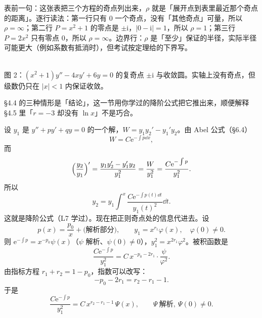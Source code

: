 \documentclass[11pt]{ctexart}
\let\origsubhdr\subhdr
\renewcommand{\subhdr}[1]{\needspace{3\baselineskip}\origsubhdr{#1}}
\newcommand{\ii}{\mathrm{i}}
\newcommand{\ee}{\mathrm{e}}
\begin{document}
表前一句：这张表把三个方程的奇点列出来，$\rho$ 就是「展开点到表里最近那个奇点的距离」。逐行读法：第一行只有 $0$ 一个奇点，没有「其他奇点」可量，所以 $\rho=\infty$；第二行 $P=x^2+1$ 的零点是 $\pm\ii$，$|0-\ii|=1$，所以 $\rho=1$；第三行 $P=2x^2$ 只有零点 $0$，所以 $\rho=\infty$。边界行：$\rho$ 是「至少」保证的半径，实际半径可能更大（例如系数有抵消时），但考试按定理给的下界写。

\begin{center}
\\[2pt]
{\small\color{inkgray}图 2：$(x^2+1)y''-4xy'+6y=0$ 的复奇点 $\pm\ii$ 与收敛圆。实轴上没有奇点，但级数仍只在 $|x|<1$ 内保证收敛。}
\end{center}



§4.4 的三种情形是「结论」，这一节用你学过的降阶公式把它推出来，顺便解释 §4.5 里「$r=-3$ 却没有 $\ln x$」不是巧合。

设 $y_1$ 是 $y''+py'+qy=0$ 的一个解，$W=y_1y_2'-y_1'y_2$。由 Abel 公式（§6.4）
\[
W=C\ee^{-\int p\dd x},
\]
而
\[
\Bigl(\frac{y_2}{y_1}\Bigr)'=\frac{y_1y_2'-y_1'y_2}{y_1^2}=\frac{W}{y_1^2}
=\frac{C\ee^{-\int p}}{y_1^2}.
\]
所以
\[
y_2=y_1\int^x\frac{C\ee^{-\int p(t)\dd t}}{y_1(t)^2}\dd t . \tag{4.7}
\]
这就是降阶公式（L7 学过）。现在把正则奇点处的信息代进去。设
\[
p(x)=\frac{p_0}{x}+\text{(解析部分)},\qquad y_1=x^{r_1}\varphi(x),\quad \varphi(0)\neq0 .
\]
则 $\ee^{-\int p}=x^{-p_0}\psi(x)$（$\psi$ 解析、$\psi(0)\neq0$），$y_1^2=x^{2r_1}\varphi^2$。被积函数是
\[
\frac{C\ee^{-\int p}}{y_1^2}=C\,x^{-p_0-2r_1}\cdot\frac{\psi}{\varphi^2}.
\]
由指标方程 $r_1+r_2=1-p_0$，指数可以改写：
\[
-p_0-2r_1=r_2-r_1-1 .
\]
于是
\[
\frac{C\ee^{-\int p}}{y_1^2}=C\,x^{r_2-r_1-1}\,\Psi(x),\qquad \Psi\ \text{解析},\ \Psi(0)\neq0 . \tag{4.8}
\]
\end{document}
